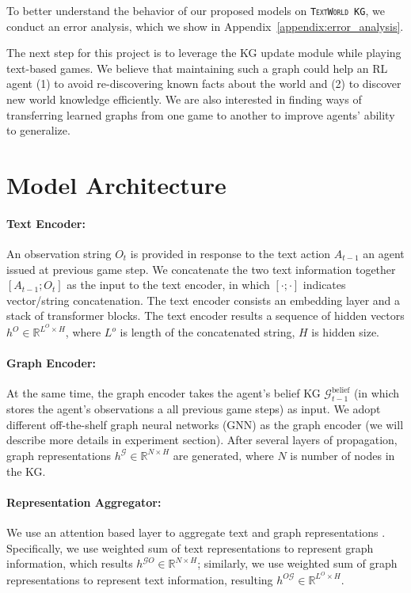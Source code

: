 \documentclass{article}
\newcommand{\twkg}{\texttt{\textsc{TextWorld KG}}\xspace}
\begin{document}
To better understand the behavior of our proposed models on \twkg, we conduct an error analysis, which we show in Appendix~\ref{appendix:error_analysis}.

The next step for this project is to leverage the KG update module while playing text-based games. We believe that maintaining such a graph could help an RL agent (1) to avoid re-discovering known facts about the world and (2) to discover new world knowledge efficiently. We are also interested in finding ways of transferring learned graphs from one game to another to improve agents' ability to generalize.






\appendix

\section{Model Architecture}
\label{appendix:model}

\paragraph{Text Encoder:}
An observation string $O_t$ is provided in response to the text action $A_{t-1}$ an agent issued at previous game step.
We concatenate the two text information together $[A_{t-1} ; O_t]$ as the input to the text encoder, in which $[\cdot;\cdot]$ indicates vector/string concatenation. 
The text encoder consists an embedding layer and a stack of transformer blocks.
The text encoder results a sequence of hidden vectors $h^O \in \mathbb{R}^{L^O \times H}$, where $L^o$ is length of the concatenated string, $H$ is hidden size.

\paragraph{Graph Encoder:}
At the same time, the graph encoder takes the agent's belief KG $\mathcal{G}^\text{belief}_{t-1}$ (in which stores the agent's observations a all previous game steps) as input. 
We adopt different off-the-shelf graph neural networks (GNN) as the graph encoder (we will describe more details in experiment section).
After several layers of propagation, graph representations $h^\mathcal{G} \in \mathbb{R}^{N \times H}$ are generated, where $N$ is number of nodes in the KG.

\paragraph{Representation Aggregator:}
We use an attention based layer to aggregate text and graph representations \citep{bahdanau2014attention,seo2016bidaf}. 
Specifically, we use weighted sum of text representations to represent graph information, which results $h^{\mathcal{G}O} \in \mathbb{R}^{N \times H}$; similarly, we use weighted sum of graph representations to represent text information, resulting $h^{O\mathcal{G}} \in \mathbb{R}^{L^O \times H}$.
\end{document}
